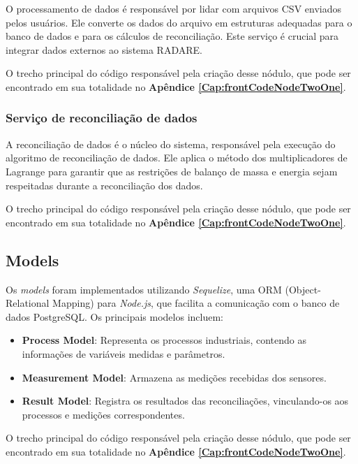 O processamento de dados é responsável por lidar com arquivos CSV enviados pelos usuários. Ele converte os dados do arquivo em estruturas adequadas para o banco de dados e para os cálculos de reconciliação. Este serviço é crucial para integrar dados externos ao sistema RADARE.

O trecho principal do código responsável pela criação desse nódulo, que pode ser encontrado em sua totalidade no \textbf{Apêndice \ref{Cap:frontCodeNodeTwoOne}}.

\subsubsection{Serviço de reconciliação de dados}

A reconciliação de dados é o núcleo do sistema, responsável pela execução do algoritmo de reconciliação de dados. Ele aplica o método dos multiplicadores de Lagrange para garantir que as restrições de balanço de massa e energia sejam respeitadas durante a reconciliação dos dados.

O trecho principal do código responsável pela criação desse nódulo, que pode ser encontrado em sua totalidade no \textbf{Apêndice \ref{Cap:frontCodeNodeTwoOne}}.

\subsection{Models}

Os \textit{models} foram implementados utilizando \textit{Sequelize}, uma ORM (Object-Relational Mapping) para \textit{Node.js}, que facilita a comunicação com o banco de dados PostgreSQL. Os principais modelos incluem:

\begin{itemize} \item \textbf{Process Model}: Representa os processos industriais, contendo as informações de variáveis medidas e parâmetros. \item \textbf{Measurement Model}: Armazena as medições recebidas dos sensores. \item \textbf{Result Model}: Registra os resultados das reconciliações, vinculando-os aos processos e medições correspondentes. \end{itemize}

O trecho principal do código responsável pela criação desse nódulo, que pode ser encontrado em sua totalidade no \textbf{Apêndice \ref{Cap:frontCodeNodeTwoOne}}.

